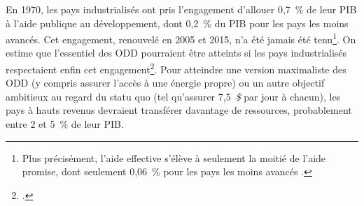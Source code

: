 \documentclass[a5paper,french,openany]{memoir}
\begin{document}
En 1970, les pays industrialisés ont pris l'engagement d'allouer 0,7~\% de leur PIB à l'aide publique au développement, dont 0,2~\% du PIB pour les pays les moins avancés. Cet engagement, renouvelé en 2005 et 2015, n'a été jamais été tenu\footnote{Plus précisément, l'aide effective s'élève à seulement la moitié de l'aide promise, dont seulement 0,06~\% pour les pays les moins avancés %
\citep{oecd_oda_2023}.}. %
On estime que l'essentiel des ODD pourraient être atteints si les pays industrialisés respectaient enfin cet engagement\footnote{\citet{sdsn_sdg_2019}.}. Pour atteindre une version maximaliste des ODD (y compris assurer l'accès à une énergie propre) ou un autre objectif ambitieux au regard du statu quo (tel qu'assurer 7,5~\textit{\$} par jour à chacun), les pays à hauts revenus devraient transférer davantage de ressources, probablement entre 2 et 5~\% 
de leur PIB. %
\end{document}
